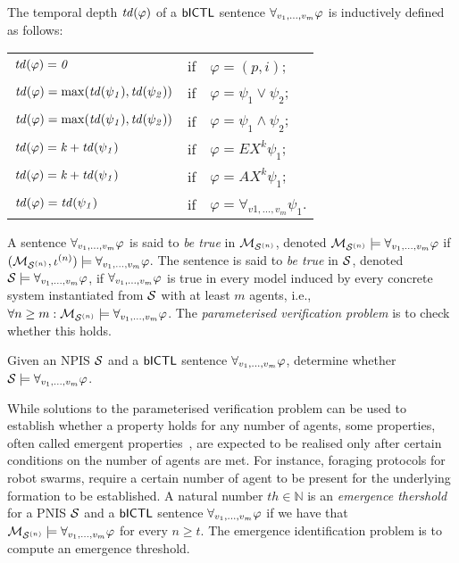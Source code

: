 \begin{definition}
The temporal depth $\it{td}(\varphi)$ of a $\sf{bICTL}$ sentence $\forall_{v_1,\ldots,v_m} \varphi$ is inductively defined as
follows:
\begin{center}
\begin{tabular}{lll}
  $\it{td}(\varphi) = 0$ & if & $\varphi = (p, i)$; \\
  $\it{td}(\varphi) = \max(\it{td}(\psi_1), \it{td}(\psi_2))$  & if & $\varphi = \psi_1 \lor \psi_2$; \\
  $\it{td}(\varphi) = \max(\it{td}(\psi_1), \it{td}(\psi_2))$  & if & $\varphi = \psi_1 \land \psi_2$; \\
  $\it{td}(\varphi) =  k + \it{td}(\psi_1)$  & if & $\varphi = EX^k \psi_1$; \\
  $\it{td}(\varphi) =  k + \it{td}(\psi_1)$  & if & $\varphi = AX^k \psi_1$; \\
  $\it{td}(\varphi) = \it{td}(\psi_1)$  & if & $\varphi = \forall_{v1,\ldots,v_m} \psi_1$.
\end{tabular}
\end{center}
\end{definition}

A sentence $\forall_{v_1,\ldots,v_m} \varphi$ is said to \emph{be true} in $\mathcal{M}_{\mathcal{S}^{(n)}}$, denoted $\mathcal{M}_{\mathcal{S}^{(n)}}
\models \forall_{v_1,\ldots,v_m} \varphi$ if $(\mathcal{M}_{\mathcal{S}^{(n)}}, \iota^{({n})}) \models \forall_{v_1,\ldots,v_m} \varphi$. The
sentence is said to \emph{be true} in $\mathcal{S}$, denoted $\mathcal{S} \models \forall_{v_1,\ldots,v_m} \varphi$, if
$\forall_{v_1,\ldots,v_m} \varphi$ is true in every model induced by every concrete system
instantiated from $\mathcal{S}$ with at least $m$ agents, i.e., $\forall n \geq m :
\mathcal{M}_{\mathcal{S}^{(n)}} \models \forall_{v_1,\ldots,v_m} \varphi$.  The {\em parameterised verification problem} is to
check whether this holds.


\begin{definition}
  Given an NPIS $\mathcal{S}$ and a $\sf{bICTL}$ sentence $\forall_{v_1,\ldots,v_m} \varphi$, determine whether
  $\mathcal{S} \models \forall_{v_1,\ldots,v_m} \varphi$.
\end{definition}

While solutions to the parameterised verification problem can be used to
establish whether a property holds for any number of agents, some properties,
often called emergent properties~\cite{KouvarosLomuscio15b}, are expected to be
realised only after certain conditions on the number of agents are met. For
instance, foraging protocols for robot swarms, require a certain number of agent
to be present for the underlying formation to be established. A natural number
$th \in \mathbb N$ is an {\em emergence thershold} for a PNIS $\mathcal{S}$  and a
$\sf{bICTL}$ sentence $\forall_{v_1,\ldots,v_m} \varphi$  if we have that $\mathcal{M}_{\mathcal{S}^{(n)}} \models \forall_{v_1,\ldots,v_m} \varphi$ for
every $n \geq t$. The emergence identification problem is to compute an
emergence threshold.


